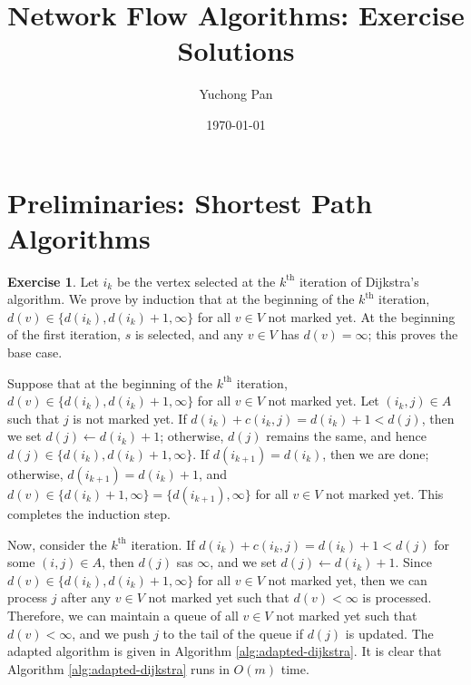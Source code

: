 \documentclass[letterpaper,reqno,12pt]{article}
\begin{document}
\title{Network Flow Algorithms: Exercise Solutions}
\author{Yuchong Pan}
\date{\today}
\newtheorem{theorem}{Theorem}
\newtheorem{lemma}{Lemma}
\newtheorem{claim}{Claim}
\theoremstyle{definition} \newtheorem{exercise}{Exercise} [section]
\theoremstyle{definition} \newtheorem{defn}{Definition}
\maketitle
%

\section{Preliminaries: Shortest Path Algorithms}

\begin{exercise}
  Let $i_k$ be the vertex selected at the $k^\text{th}$ iteration of Dijkstra's algorithm. We prove by induction that at the beginning of the $k^\text{th}$ iteration, $d(v) \in \{ d(i_k), d(i_k) + 1, \infty \}$ for all $v \in V$ not marked yet. At the beginning of the first iteration, $s$ is selected, and any $v \in V$ has $d(v) = \infty$; this proves the base case.
  
  Suppose that at the beginning of the $k^\text{th}$ iteration, $d(v) \in \{ d(i_k), d(i_k) + 1, \infty \}$ for all $v \in V$ not marked yet. Let $(i_k, j) \in A$ such that $j$ is not marked yet. If $d(i_k) + c(i_k, j) = d(i_k) + 1 < d(j)$, then we set $d(j) \leftarrow d(i_k) + 1$; otherwise, $d(j)$ remains the same, and hence $d(j) \in \{ d(i_k), d(i_k) + 1, \infty \}$. If $d(i_{k + 1}) = d(i_k)$, then we are done; otherwise, $d(i_{k + 1}) = d(i_k) + 1$, and $d(v) \in \{ d(i_k) + 1, \infty \} = \{ d(i_{k + 1}), \infty \}$ for all $v \in V$ not marked yet. This completes the induction step.

  Now, consider the $k^\text{th}$ iteration. If $d(i_k) + c(i_k, j) = d(i_k) + 1 < d(j)$ for some $(i, j) \in A$, then $d(j)$ sas $\infty$, and we set $d(j) \leftarrow d(i_k) + 1$. Since $d(v) \in \{ d(i_k), d(i_k) + 1, \infty \}$ for all $v \in V$ not marked yet, then we can process $j$ after any $v \in V$ not marked yet such that $d(v) < \infty$ is processed. Therefore, we can maintain a queue of all $v \in V$ not marked yet such that $d(v) < \infty$, and we push $j$ to the tail of the queue if $d(j)$ is updated. The adapted algorithm is given in Algorithm \ref{alg:adapted-dijkstra}. It is clear that Algorithm \ref{alg:adapted-dijkstra} runs in $O(m)$ time.


\end{exercise}
\end{document}
